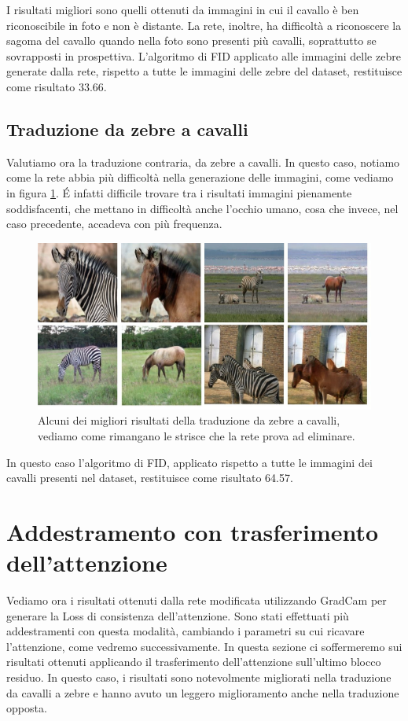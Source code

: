 I risultati migliori sono quelli ottenuti da immagini in cui il cavallo è ben riconoscibile in foto e non è distante. La rete, inoltre, ha difficoltà a riconoscere la sagoma del cavallo quando nella foto sono presenti più cavalli, soprattutto se sovrapposti in prospettiva. L'algoritmo di FID applicato alle immagini delle zebre generate dalla rete, rispetto a tutte le immagini delle zebre del dataset, restituisce come risultato 33.66.
\subsection{Traduzione da zebre a cavalli}
Valutiamo ora la traduzione contraria, da zebre a cavalli. In questo caso, notiamo come la rete abbia più difficoltà nella generazione delle immagini, come vediamo in figura \ref{fig:Risultati Horse Cycle GAN (1)}. \'E infatti difficile trovare tra i risultati immagini pienamente soddisfacenti, che mettano in difficoltà anche l'occhio umano, cosa che invece, nel caso precedente, accadeva con più frequenza.
\begin{figure}[H]
\begin{center}
\includegraphics[width=1\columnwidth]{images/CycleGan horse (1).jpeg} 
\end{center}
\caption{Alcuni dei migliori risultati della traduzione da zebre a cavalli, vediamo come rimangano le strisce che la rete prova ad eliminare.}
\label{fig:Risultati Horse Cycle GAN (1)}
\end{figure} 
In questo caso l'algoritmo di FID, applicato rispetto a tutte le immagini dei cavalli presenti nel dataset, restituisce come risultato 64.57.

\section{Addestramento con trasferimento dell'attenzione}
Vediamo ora i risultati ottenuti dalla rete modificata utilizzando GradCam per generare la Loss di consistenza dell'attenzione. Sono stati effettuati più addestramenti con questa modalità, cambiando i parametri su cui ricavare l'attenzione, come vedremo successivamente. In questa sezione ci soffermeremo sui risultati ottenuti applicando il trasferimento dell'attenzione sull'ultimo blocco residuo. In questo caso, i risultati sono notevolmente migliorati nella traduzione da cavalli a zebre e hanno avuto un leggero miglioramento anche nella traduzione opposta.
